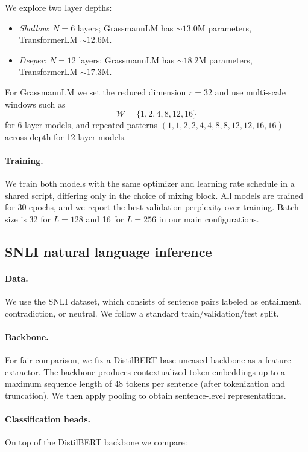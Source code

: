 \documentclass[11pt]{article}
\begin{document}
We explore two layer depths:
\begin{itemize}
    \item \emph{Shallow}: $N=6$ layers; GrassmannLM has $\sim13.0$M parameters, TransformerLM $\sim12.6$M.
    \item \emph{Deeper}: $N=12$ layers; GrassmannLM has $\sim18.2$M parameters, TransformerLM $\sim17.3$M.
\end{itemize}

For GrassmannLM we set the reduced dimension $r = 32$ and use multi-scale windows such as
\[
\mathcal{W} = \{1,2,4,8,12,16\}
\]
for 6-layer models, and repeated patterns $(1,1,2,2,4,4,8,8,12,12,16,16)$ across depth for 12-layer models.

\paragraph{Training.}
We train both models with the same optimizer and learning rate schedule in a shared script, differing only in the choice of mixing block. All models are trained for 30 epochs, and we report the best validation perplexity over training. Batch size is 32 for $L=128$ and 16 for $L=256$ in our main configurations.

\subsection{SNLI natural language inference}

\paragraph{Data.}
We use the SNLI dataset, which consists of sentence pairs labeled as entailment, contradiction, or neutral. We follow a standard train/validation/test split.

\paragraph{Backbone.}
For fair comparison, we fix a DistilBERT-base-uncased backbone as a feature extractor. The backbone produces contextualized token embeddings up to a maximum sequence length of 48 tokens per sentence (after tokenization and truncation). We then apply pooling to obtain sentence-level representations.

\paragraph{Classification heads.}
On top of the DistilBERT backbone we compare:
\end{document}
